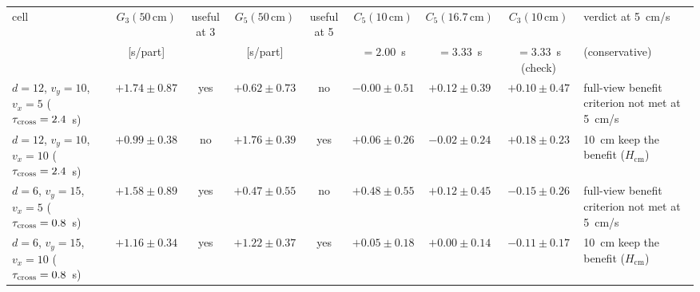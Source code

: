 \begin{tabular}{@{}lcccccccl@{}}
\toprule
cell & $G_3(50\,\mathrm{cm})$ & useful at 3 & $G_5(50\,\mathrm{cm})$ & useful at 5 & $C_5(10\,\mathrm{cm})$ & $C_5(16.7\,\mathrm{cm})$ & $C_3(10\,\mathrm{cm})$ & verdict at 5~cm/s \\
 & [s/part] & & [s/part] & & $=2.00$~s & $=3.33$~s & $=3.33$~s (check) & (conservative) \\
\midrule
$d=12$, $v_y=10$, $v_x=5$ ($\tau_{\mathrm{cross}}=2.4$~s) & $+1.74 \pm 0.87$ & yes & $+0.62 \pm 0.73$ & no & $-0.00 \pm 0.51$ & $+0.12 \pm 0.39$ & $+0.10 \pm 0.47$ & full-view benefit criterion not met at 5~cm/s \\
$d=12$, $v_y=10$, $v_x=10$ ($\tau_{\mathrm{cross}}=2.4$~s) & $+0.99 \pm 0.38$ & no & $+1.76 \pm 0.39$ & yes & $+0.06 \pm 0.26$ & $-0.02 \pm 0.24$ & $+0.18 \pm 0.23$ & 10~cm keep the benefit ($H_{\mathrm{cm}}$) \\
$d=6$, $v_y=15$, $v_x=5$ ($\tau_{\mathrm{cross}}=0.8$~s) & $+1.58 \pm 0.89$ & yes & $+0.47 \pm 0.55$ & no & $+0.48 \pm 0.55$ & $+0.12 \pm 0.45$ & $-0.15 \pm 0.26$ & full-view benefit criterion not met at 5~cm/s \\
$d=6$, $v_y=15$, $v_x=10$ ($\tau_{\mathrm{cross}}=0.8$~s) & $+1.16 \pm 0.34$ & yes & $+1.22 \pm 0.37$ & yes & $+0.05 \pm 0.18$ & $+0.00 \pm 0.14$ & $-0.11 \pm 0.17$ & 10~cm keep the benefit ($H_{\mathrm{cm}}$) \\
\bottomrule
\end{tabular}
